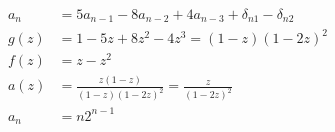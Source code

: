 \documentclass[12pt]{article}
\begin{document}
\begin{equation}
\begin{split}
    a_n & = 5a_{n - 1} - 8a_{n - 2} + 4a_{n - 3} + \delta_{n1} - \delta_{n2} \\
    g(z) & = 1 - 5z + 8z^2 - 4z^3 = (1 - z)(1 - 2z)^2 \\
    f(z) & = z - z^2 \\
    a(z) & = \frac{z(1 - z)}{(1 - z)(1 - 2z)^2} = \frac{z}{(1 - 2z)^2} \\
    a_n & = n2^{n - 1} \nonumber
\end{split}
\end{equation}
\end{document}
